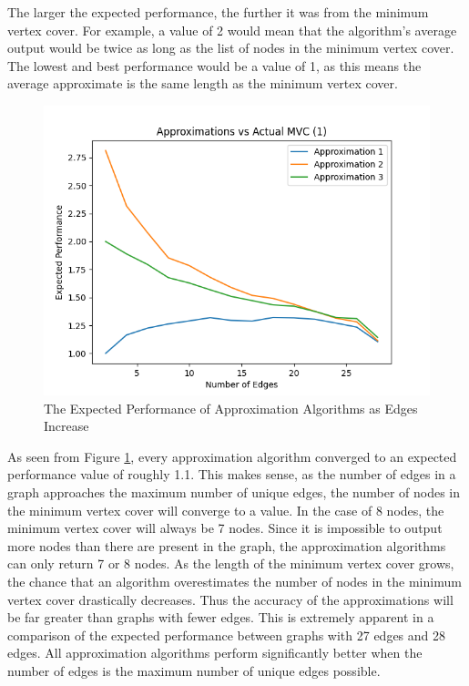 \documentclass[titlepage]{article}
\begin{document}
The larger the expected performance, the further it was from the minimum vertex cover. For example, a value of 2 would mean that the algorithm's average output would be twice as long as the list of nodes in the minimum vertex cover. The lowest and best performance would be a value of 1, as this means the average approximate is the same length as the minimum vertex cover.

\begin{figure}[H]
    \centering
    \includegraphics[width=0.8\linewidth]{experiment_3_1.png}
    \caption{The Expected Performance of Approximation Algorithms as Edges Increase}
    \label{fig:experiment_3_1}
\end{figure}

As seen from Figure \ref{fig:experiment_3_1}, every approximation algorithm converged to an expected performance value of roughly 1.1. This makes sense, as the number of edges in a graph approaches the maximum number of unique edges, the number of nodes in the minimum vertex cover will converge to a value. In the case of 8 nodes, the minimum vertex cover will always be 7 nodes. Since it is impossible to output more nodes than there are present in the graph, the approximation algorithms can only return 7 or 8 nodes. As the length of the minimum vertex cover grows, the chance that an algorithm overestimates the number of nodes in the minimum vertex cover drastically decreases. Thus the accuracy of the approximations will be far greater than graphs with fewer edges. This is extremely apparent in a comparison of the expected performance between graphs with 27 edges and 28 edges. All approximation algorithms perform significantly better when the number of edges is the maximum number of unique edges possible.
\end{document}
